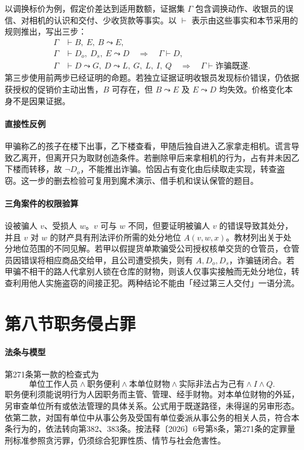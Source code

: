 以调换标价为例，假定价差达到适用数额，证据集 $\Gamma$ 包含调换动作、收银员的误信、对相机的认识和交付、少收货款等事实。以 $\vdash$ 表示由这些事实和本节采用的规则推出，写出三步：
\[
\begin{aligned}
 \Gamma&\vdash B,\ E,\ B\leadsto E,\\
 \Gamma&\vdash D_o,\ D_s,\ E\leadsto D
           \quad\Longrightarrow\quad \Gamma\vdash D,\\
 \Gamma&\vdash D\leadsto G,\ D\leadsto L,\ G,\ L,\ I,\ Q
           \quad\Longrightarrow\quad \Gamma\vdash\text{诈骗既遂}.
\end{aligned}
\]
第三步使用前两步已经证明的命题。若独立证据证明收银员发现标价错误，仍依据获授权的促销价主动出售，$B$ 可存在，但 $B\leadsto E$ 及 $E\leadsto D$ 均失效。价格变化本身不是因果证据。

\paragraph{直接性反例}
甲骗称乙的孩子在楼下出事，乙下楼查看，甲随后独自进入乙家拿走相机。谎言导致乙离开，但离开只为取财创造条件。若删除甲后来拿相机的行为，占有并未因乙下楼而转移，故 $\neg D_o$，不能推出诈骗。恰因占有变化由后续取走实现，转查盗窃。这一步的删去检验可复用到魔术演示、借手机和误认保管的题目。

\paragraph{三角案件的权限验算}
设被骗人 $v$、受损人 $w$。$v$ 可与 $w$ 不同，但要证明被骗人 $v$ 的错误导致其处分，并且 $v$ 对 $w$ 的财产具有刑法评价所需的处分地位 $A(v,w,x)$。教材列出关于处分地位范围的不同见解。若甲以假提货单欺骗受公司授权核单交货的仓管员，仓管员因错误将相应商品交给甲，且公司遭受损失，则有 $A,D_o,D_s$，诈骗链闭合。若甲骗不相干的路人代拿别人锁在仓库的财物，则该人仅事实接触而无处分地位，转查利用他人实施盗窃的间接正犯。两种结论不能由「经过第三人交付」一语分流。

\section{第八节\quad 职务侵占罪}

\paragraph{法条与模型}
第271条第一款的检查式为
\[
 \text{单位工作人员}\land\text{职务便利}
 \land\text{本单位财物}\land\text{实际非法占为己有}
 \land I\land Q .
\]
职务便利须能说明行为人因职务而主管、管理、经手财物。对本单位财物的外延，另审查单位所有或依法管理的具体关系。公式用于既遂路径，未得逞的另审形态。依第二款，对国有单位中从事公务及受国有单位委派从事公务的相关人员，符合本条行为的，依法转向第382、383条。按法释〔2026〕6号第8条，第271条的定罪量刑标准参照贪污罪，仍须综合犯罪性质、情节与社会危害性。


